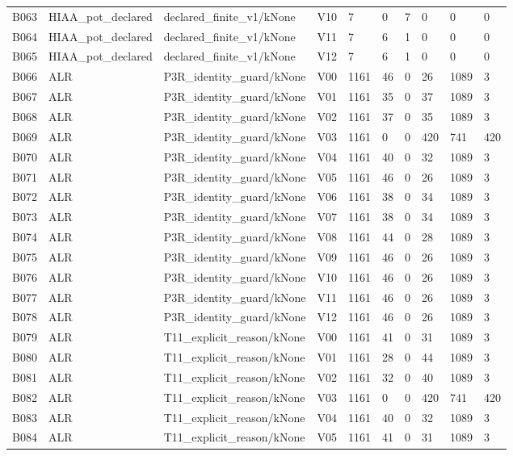 \begin{longtable}{llllllllll}
B063 & HIAA\_pot\_declared & declared\_finite\_v1/kNone & V10 & 7 & 0 & 7 & 0 & 0 & 0 \\
B064 & HIAA\_pot\_declared & declared\_finite\_v1/kNone & V11 & 7 & 6 & 1 & 0 & 0 & 0 \\
B065 & HIAA\_pot\_declared & declared\_finite\_v1/kNone & V12 & 7 & 6 & 1 & 0 & 0 & 0 \\
B066 & ALR & P3R\_identity\_guard/kNone & V00 & 1161 & 46 & 0 & 26 & 1089 & 3 \\
B067 & ALR & P3R\_identity\_guard/kNone & V01 & 1161 & 35 & 0 & 37 & 1089 & 3 \\
B068 & ALR & P3R\_identity\_guard/kNone & V02 & 1161 & 37 & 0 & 35 & 1089 & 3 \\
B069 & ALR & P3R\_identity\_guard/kNone & V03 & 1161 & 0 & 0 & 420 & 741 & 420 \\
B070 & ALR & P3R\_identity\_guard/kNone & V04 & 1161 & 40 & 0 & 32 & 1089 & 3 \\
B071 & ALR & P3R\_identity\_guard/kNone & V05 & 1161 & 46 & 0 & 26 & 1089 & 3 \\
B072 & ALR & P3R\_identity\_guard/kNone & V06 & 1161 & 38 & 0 & 34 & 1089 & 3 \\
B073 & ALR & P3R\_identity\_guard/kNone & V07 & 1161 & 38 & 0 & 34 & 1089 & 3 \\
B074 & ALR & P3R\_identity\_guard/kNone & V08 & 1161 & 44 & 0 & 28 & 1089 & 3 \\
B075 & ALR & P3R\_identity\_guard/kNone & V09 & 1161 & 46 & 0 & 26 & 1089 & 3 \\
B076 & ALR & P3R\_identity\_guard/kNone & V10 & 1161 & 46 & 0 & 26 & 1089 & 3 \\
B077 & ALR & P3R\_identity\_guard/kNone & V11 & 1161 & 46 & 0 & 26 & 1089 & 3 \\
B078 & ALR & P3R\_identity\_guard/kNone & V12 & 1161 & 46 & 0 & 26 & 1089 & 3 \\
B079 & ALR & T11\_explicit\_reason/kNone & V00 & 1161 & 41 & 0 & 31 & 1089 & 3 \\
B080 & ALR & T11\_explicit\_reason/kNone & V01 & 1161 & 28 & 0 & 44 & 1089 & 3 \\
B081 & ALR & T11\_explicit\_reason/kNone & V02 & 1161 & 32 & 0 & 40 & 1089 & 3 \\
B082 & ALR & T11\_explicit\_reason/kNone & V03 & 1161 & 0 & 0 & 420 & 741 & 420 \\
B083 & ALR & T11\_explicit\_reason/kNone & V04 & 1161 & 40 & 0 & 32 & 1089 & 3 \\
B084 & ALR & T11\_explicit\_reason/kNone & V05 & 1161 & 41 & 0 & 31 & 1089 & 3 \\

\end{longtable}
